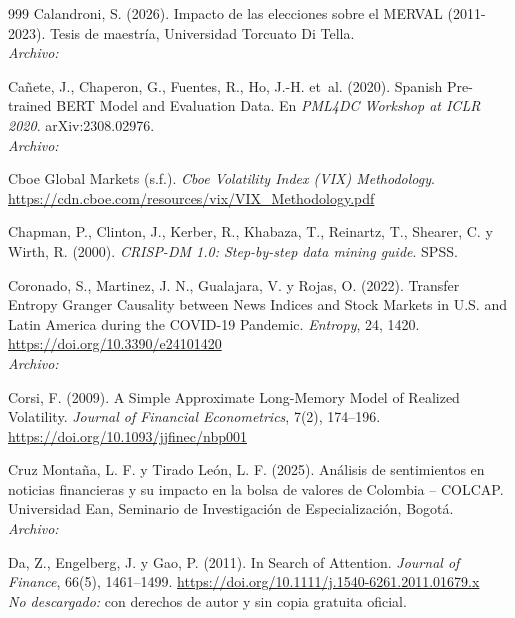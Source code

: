 \begin{thebibliography}{999}
Calandroni, S. (2026). Impacto de las elecciones sobre el MERVAL (2011-2023). Tesis de maestría, Universidad Torcuato Di Tella.
\\\textit{Archivo:} 

Ca{\~n}ete, J., Chaperon, G., Fuentes, R., Ho, J.-H. et~al. (2020). Spanish Pre-trained {BERT} Model and Evaluation Data. En \emph{PML4DC Workshop at ICLR 2020}. arXiv:2308.02976.
\\\textit{Archivo:} 

Cboe Global Markets (s.f.). \textit{Cboe Volatility Index (VIX) Methodology}. \url{https://cdn.cboe.com/resources/vix/VIX_Methodology.pdf}

Chapman, P., Clinton, J., Kerber, R., Khabaza, T., Reinartz, T., Shearer, C. y Wirth, R. (2000). \textit{CRISP-DM 1.0: Step-by-step data mining guide}. SPSS.

Coronado, S., Martinez, J. N., Gualajara, V. y Rojas, O. (2022). Transfer Entropy Granger Causality between News Indices and Stock Markets in {U.S.} and {Latin America} during the {COVID-19} Pandemic. \emph{Entropy}, 24, 1420. \url{https://doi.org/10.3390/e24101420}
\\\textit{Archivo:} 

Corsi, F. (2009). A Simple Approximate Long-Memory Model of Realized Volatility. \textit{Journal of Financial Econometrics}, 7(2), 174--196. \url{https://doi.org/10.1093/jjfinec/nbp001}

Cruz Monta{\~n}a, L. F. y Tirado Le{\'o}n, L. F. (2025). An{\'a}lisis de sentimientos en noticias financieras y su impacto en la bolsa de valores de {Colombia} -- {COLCAP}. Universidad Ean, Seminario de Investigaci{\'o}n de Especializaci{\'o}n, Bogot{\'a}.
\\\textit{Archivo:} 

Da, Z., Engelberg, J. y Gao, P. (2011). In Search of Attention. \emph{Journal of Finance}, 66(5), 1461--1499. \url{https://doi.org/10.1111/j.1540-6261.2011.01679.x}
\\\textit{No descargado:} con derechos de autor y sin copia gratuita oficial.


\end{thebibliography}

